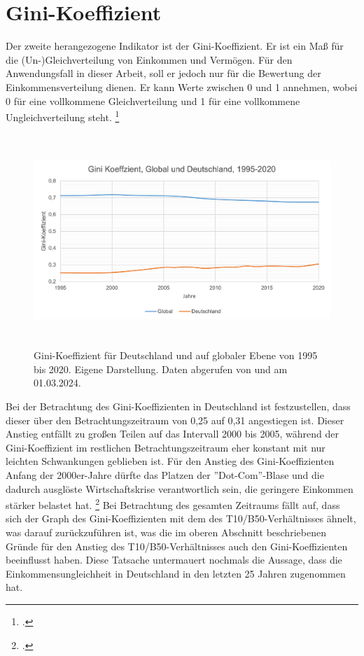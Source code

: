 \section{Gini-Koeffizient}

Der zweite herangezogene Indikator ist der Gini-Koeffizient. Er ist ein Ma{\ss} für die (Un-)Gleichverteilung von Einkommen und Vermögen. Für den Anwendungsfall in dieser Arbeit, soll er jedoch nur für die Bewertung der Einkommensverteilung dienen. Er kann Werte zwischen 0 und 1 annehmen, wobei 0 für eine vollkommene Gleichverteilung und 1 für eine vollkommene Ungleichverteilung steht. \footcite[Vgl.][]{gini_definition_diw_2024}

\begin{figure}[h]
    \centering
    \includegraphics[height=8cm]{Bilder/Gini-Koeffizient2.png}
    \caption[Gini-Koeffizient, Deutschland und global, 1995-2020]{Gini-Koeffizient für Deutschland und auf globaler Ebene von 1995 bis 2020. Eigene Darstellung. Daten abgerufen von \cite[][, S.56 (global)]{wir_2022} und \cite[][(Deutschland)]{bmas_arb_gini_2020} am 01.03.2024.}
    \label{fig:iso_norm}
\end{figure}

Bei der Betrachtung des Gini-Koeffizienten in Deutschland ist festzustellen, dass dieser über den Betrachtungszeitraum von 0,25 auf 0,31 angestiegen ist. Dieser Anstieg entfällt zu gro{\ss}en Teilen auf das Intervall 2000 bis 2005, während der Gini-Koeffizient im restlichen Betrachtungszeitraum eher konstant mit nur leichten Schwankungen geblieben ist. Für den Anstieg des Gini-Koeffizienten Anfang der 2000er-Jahre dürfte das Platzen der ''Dot-Com''-Blase und die dadurch ausglöste Wirtschaftskrise verantwortlich sein, die geringere Einkommen stärker belastet hat. \footcite[Vgl. ][S. 3]{horn_wirtschaftskrise_2014} Bei Betrachtung des gesamten Zeitraums fällt auf, dass sich der Graph des Gini-Koeffizienten mit dem des T10/B50-Verhältnisses ähnelt, was darauf zurückzuführen ist, was die im oberen Abschnitt beschriebenen Gründe für den Anstieg des T10/B50-Verhältnisses auch den Gini-Koeffizienten beeinflusst haben. Diese Tatsache untermauert nochmals die Aussage, dass die Einkommensungleichheit in Deutschland in den letzten 25 Jahren zugenommen hat.


